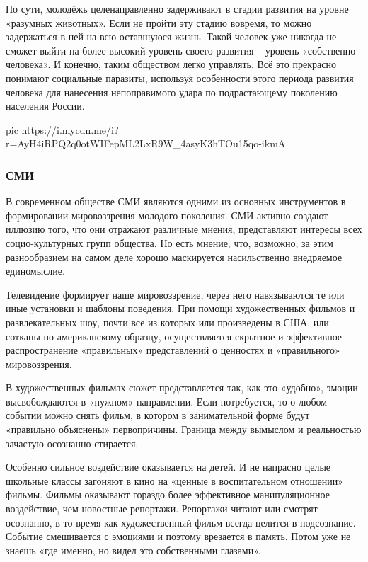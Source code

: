 По сути, молодёжь целенаправленно задерживают
в стадии развития на уровне «разумных животных». Если не пройти эту стадию
вовремя, то можно задержаться в ней на всю оставшуюся жизнь. Такой человек уже
никогда не сможет выйти на более высокий уровень своего развития – уровень
«собственно человека». И конечно, таким обществом легко управлять. Всё это
прекрасно понимают социальные паразиты, используя особенности этого периода
развития человека для нанесения непоправимого удара по подрастающему поколению
населения России. 

\ifcmt
pic https://i.mycdn.me/i?r=AyH4iRPQ2q0otWIFepML2LxR9W_4asyK3hTOu15qo-ikmA
\fi

\subsubsection{СМИ}

В современном обществе СМИ являются одними из основных инструментов в
формировании мировоззрения молодого поколения. СМИ активно создают иллюзию
того, что они отражают различные мнения, представляют интересы всех
социо-культурных групп общества. Но есть мнение, что, возможно, за этим
разнообразием на самом деле хорошо маскируется насильственно внедряемое
единомыслие. 

Телевидение формирует наше мировоззрение, через него навязываются
те или иные установки и шаблоны поведения. При помощи художественных фильмов и
развлекательных шоу, почти все из которых или произведены в США, или сотканы по
американскому образцу, осуществляется скрытное и эффективное распространение
«правильных» представлений о ценностях и «правильного» мировоззрения. 

В художественных фильмах сюжет представляется так, как это «удобно», эмоции
высвобождаются в «нужном» направлении. Если потребуется, то о любом событии
можно снять фильм, в котором в занимательной форме будут «правильно объяснены»
первопричины. Граница между вымыслом и реальностью зачастую осознанно
стирается. 

Особенно сильное воздействие оказывается на детей. И не напрасно целые школьные
классы загоняют в кино на «ценные в воспитательном отношении» фильмы. Фильмы
оказывают гораздо более эффективное манипуляционное воздействие, чем новостные
репортажи. Репортажи читают или смотрят осознанно, в то время как
художественный фильм всегда целится в подсознание. Событие смешивается с
эмоциями и поэтому врезается в память. Потом уже не знаешь «где именно, но
видел это собственными глазами». 

